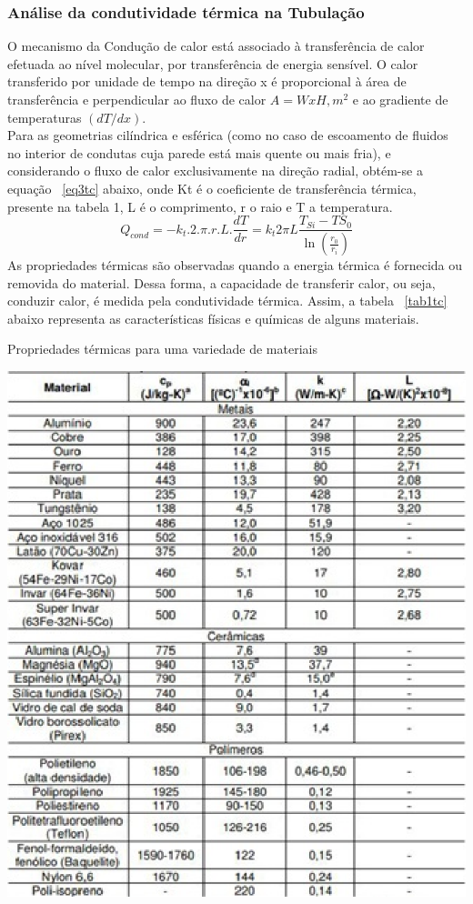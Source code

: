 \subsubsection{Análise da condutividade térmica na Tubulação}
O mecanismo da Condução de calor está associado à transferência de calor efetuada ao nível molecular, por transferência de energia sensível. O calor transferido por unidade de tempo na direção x é proporcional à área de transferência e perpendicular ao fluxo de calor $A =WxH, m^2$ e ao gradiente de temperaturas $(dT/dx)$. \\
Para as geometrias cilíndrica e esférica (como no caso de escoamento de fluidos no interior de condutas cuja parede está mais quente ou mais fria), e considerando o fluxo de calor exclusivamente na direção radial, obtém-se a equação ~\ref{eq3tc} abaixo, onde Kt é o coeficiente de transferência térmica, presente na tabela 1, L é o comprimento, r o raio e T a temperatura.\\
\begin{equation}\label{eq3tc}
Q_{cond}=-k_t.2.\pi.r.L.\frac{dT}{dr}=k_t2\pi L\frac{T_{Si}-T{S_0}}{\ln(\frac{r_0}{r_i})}
\end{equation}
As propriedades térmicas  são observadas quando a energia térmica é fornecida ou removida do material. Dessa forma, a capacidade de transferir calor, ou seja, conduzir calor, é medida pela condutividade térmica. Assim, a tabela ~\ref{tab1tc} abaixo representa as características físicas e químicas de alguns materiais.
\begin{table}[!htb]
	\centering
	\caption{Propriedades térmicas para uma variedade de materiais}\label{tab1tc}
    \includegraphics[scale=1]{figuras/Figura4tc.eps}
\end{table}
